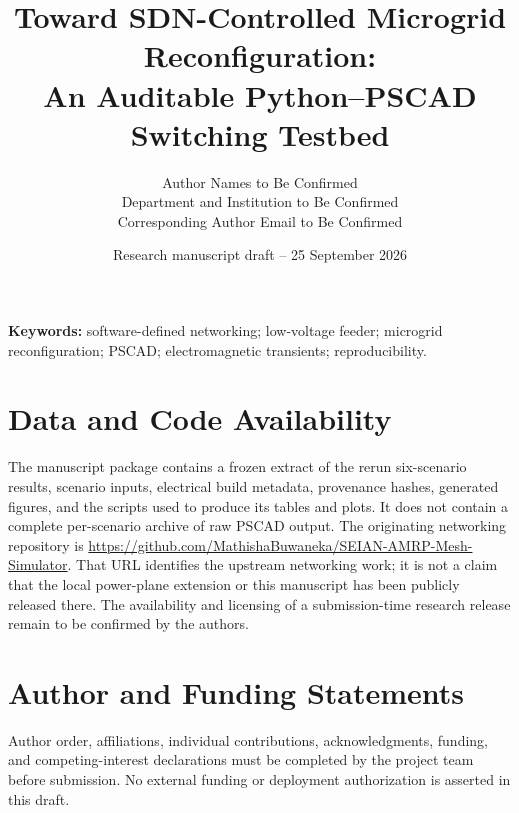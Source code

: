 \documentclass[10pt,a4paper]{article}
\title{Toward SDN-Controlled Microgrid Reconfiguration:\\
An Auditable Python--PSCAD Switching Testbed}
\author{Author Names to Be Confirmed\\
\small Department and Institution to Be Confirmed\\
\small Corresponding Author Email to Be Confirmed}
\date{Research manuscript draft -- 25 September 2026}
\begin{document}
\maketitle

\noindent\textbf{Keywords:} software-defined networking; low-voltage feeder;
microgrid reconfiguration; PSCAD; electromagnetic transients; reproducibility.










\section*{Data and Code Availability}
The manuscript package contains a frozen extract of the rerun six-scenario
results, scenario inputs, electrical build metadata, provenance hashes,
generated figures, and the scripts used to produce its tables and plots.
It does not contain a complete per-scenario archive of raw PSCAD output.
The originating networking repository is
\url{https://github.com/MathishaBuwaneka/SEIAN-AMRP-Mesh-Simulator}.
That URL identifies the upstream networking work; it is not a claim that the
local power-plane extension or this manuscript has been publicly released there.
The availability and licensing of a submission-time research release remain
to be confirmed by the authors.

\section*{Author and Funding Statements}
Author order, affiliations, individual contributions, acknowledgments, funding,
and competing-interest declarations must be completed by the project team
before submission. No external funding or deployment authorization is asserted
in this draft.



\appendix

\end{document}
